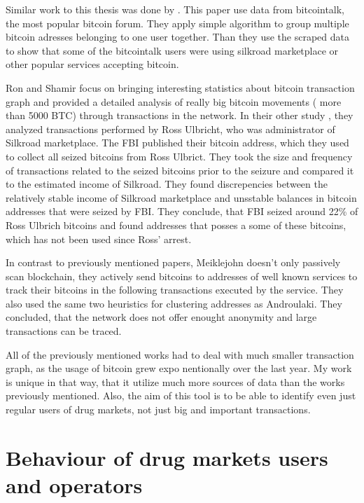 \documentclass[
  digital, %
  table,   %
  lof,     %
  lot,     %
  oneside
]{fithesis3}
\begin{document}
Similar work to this thesis was done by \parencite{fleder2015bitcoin}.
This paper use data from bitcointalk, the most popular bitcoin forum. 
They apply simple algorithm to group multiple bitcoin adresses belonging to one user together.
Than they use the scraped data to show
that some of the bitcointalk users were using silkroad marketplace or other popular services accepting bitcoin.
 
Ron and Shamir \parencite{ron2013quantitative} focus on bringing
interesting statistics about bitcoin transaction graph
and provided a detailed analysis of really big bitcoin movements ( more than 5000 BTC) 
through transactions in the network.
In their other study \parencite{ron2014did}, they analyzed transactions performed by Ross Ulbricht,
who was administrator of Silkroad marketplace.
The FBI published their bitcoin address, which they used to collect all seized bitcoins from Ross Ulbrict.
They took the size and frequency of transactions related to the seized bitcoins prior to the seizure and compared 
it to the estimated income of Silkroad. They found discrepencies between the
relatively stable income of Silkroad marketplace and unsstable balances in bitcoin addresses
that were seized by FBI. They conclude, that FBI seized around 22\% of Ross Ulbrich bitcoins
and found addresses that posses a some of these bitcoins, which has not been used since Ross' arrest.

In contrast to previously mentioned papers, Meiklejohn \parencite{meiklejohn2013fistful} 
doesn't only passively scan blockchain, they actively send bitcoins to addresses of
well known services to track their bitcoins in the following transactions executed by the service.
They also used the same two heuristics for clustering addresses
as Androulaki. \parencite{androulaki2013evaluating}
They concluded, that the network does not offer enought anonymity and large transactions can be traced.

All of the previously mentioned works had to deal with much smaller transaction graph, as the usage of bitcoin grew expo
nentionally over the last year. 
My work is unique in that way, that it utilize much more sources of data than the works previously mentioned. Also, the 
aim of this tool is to be able
to identify even just regular users of drug markets, not just big and important transactions.

\section{Behaviour of drug markets users and operators}
\end{document}

